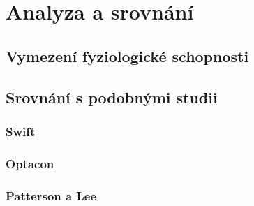 \chapter{Analyza a srovnání}

\section{Vymezení fyziologické schopnosti}

\section{Srovnání s podobnými studii}

\subsection{Swift}
\subsection{Optacon}
\subsection{Patterson a Lee}
